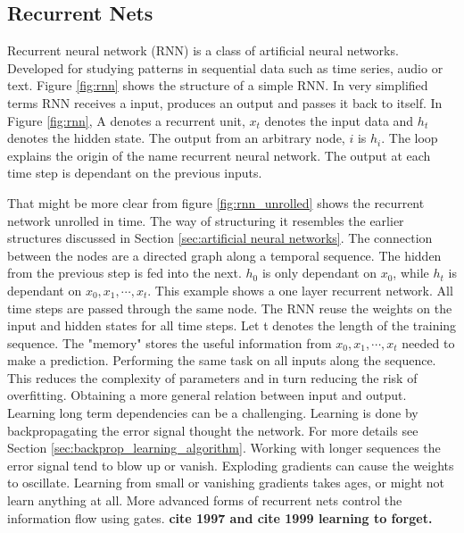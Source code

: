 \documentclass{article}
\begin{document}
\subsection{Recurrent Nets} \label{sec:reccurent_nets}

Recurrent neural network (RNN) is a class of artificial neural networks. Developed for studying patterns in sequential data such as time series, audio or text. Figure \ref{fig:rnn} shows the structure of a simple RNN. In very simplified terms RNN receives a input, produces an output and passes it back to itself. In Figure \ref{fig:rnn}, A denotes a recurrent unit, $x_t$ denotes the input data and  $h_t$ denotes the hidden state. The output from an arbitrary node, $i$ is $h_i$. The loop explains the origin of the name recurrent neural network. The output at each time step is dependant on the previous inputs.

That might be more clear from figure \ref{fig:rnn_unrolled} shows the recurrent network unrolled in time. The way of structuring it resembles the earlier structures discussed in Section \ref{sec:artificial neural networks}. The connection between the nodes %
are a directed graph along a temporal sequence. The hidden from the previous step is fed into the next. $h_0$ is only dependant on $x_0$, while $h_t$ is dependant on $x_0, x_1, \cdots, x_t $. This example shows a one layer recurrent network. All time steps are passed through the same node. The RNN reuse the weights on the input and hidden states for all time steps. Let t denotes the length of the training sequence. The "memory" stores the useful information from $x_0, x_1, \cdots, x_t $ needed to make a prediction. Performing the same task on all inputs along the sequence. This reduces the complexity of parameters and in turn reducing the risk of overfitting. Obtaining a more general relation between input and output.
Learning long term dependencies can be a challenging. Learning is done by backpropagating the error signal thought the network. For more details see Section \ref{sec:backprop_learning_algorithm}. Working with longer sequences the error signal tend to blow up or vanish. Exploding gradients can cause the weights to oscillate. Learning from small or vanishing gradients takes ages, or might not learn anything at all. More advanced forms of recurrent nets control the information flow using gates. \textbf{cite 1997 and cite 1999 learning to forget.}
\end{document}
